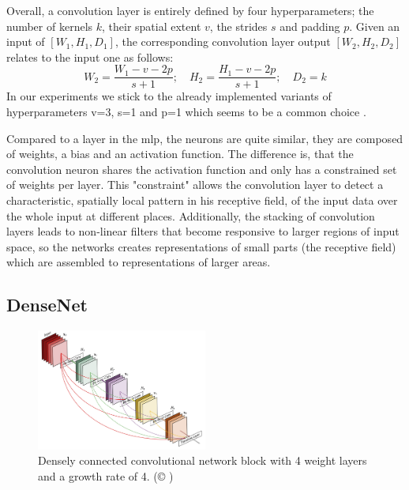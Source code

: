 Overall, a convolution layer is entirely defined by four hyperparameters; the number of kernels $k$, their spatial extent $v$, the strides $s$ and padding $p$. Given an input of $[W_1, H_1, D_1]$, the corresponding convolution layer output $[W_2, H_2, D_2]$ relates to the input one as follows:
$$
W_2 = \frac{W_1-v-2p}{s+1}; \quad H_2=\frac{H_1-v-2p}{s+1}; \quad D_2 = k
$$
In our experiments we stick to the already implemented variants of hyperparameters v=3, s=1 and p=1 which seems to be a common choice \cite{Huang2017a, Simonyan2015}.

Compared to a layer in the \gls{mlp}, the neurons are quite similar, they are composed of weights, a bias and an activation function. The difference is, that the convolution neuron shares the activation function and only has a constrained set of weights per layer. This "constraint" allows the convolution layer to detect a characteristic, spatially local pattern in his receptive field, of the input data over the whole input at different places. Additionally, the stacking of convolution layers leads to non-linear filters that become responsive to larger regions of input space, so the networks creates representations of small parts (the receptive field) which are assembled to representations of larger areas.

\subsection{DenseNet}\label{sec:denseNet}
\begin{figure}[ht!]
\centering
  \includegraphics[width=0.5\textwidth]{image/denseNetBlock.jpg}
  \caption{Densely connected convolutional network block with 4 weight layers and a growth rate of 4. (© \cite{Huang2017a})}
  \label{fig:denseNet_block}
\end{figure}

